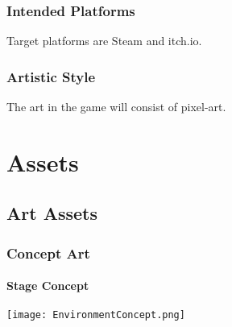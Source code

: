 \documentclass[11pt,fleqn]{book} %
\begin{document}
\section{Intended Platforms}

Target platforms are Steam and itch.io.

\section{Artistic Style}

The art in the game will consist of pixel-art.









\part{Assets}



\chapter{Art Assets}
\section{Concept Art}
	\subsection{Stage Concept}
		\texttt{[image: EnvironmentConcept.png]}
\end{document}
